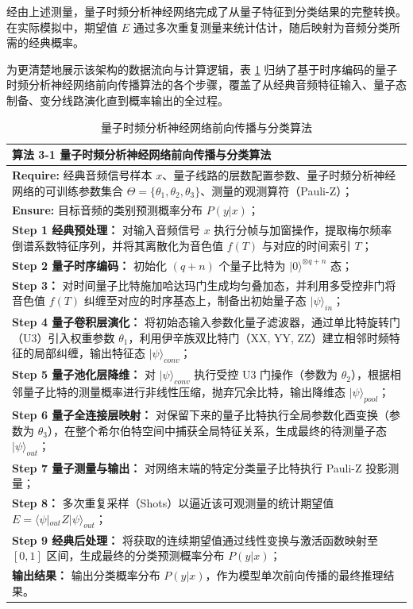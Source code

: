 经由上述测量，量子时频分析神经网络完成了从量子特征到分类结果的完整转换。在实际模拟中，期望值 $E$ 通过多次重复测量来统计估计，随后映射为音频分类所需的经典概率。

为更清楚地展示该架构的数据流向与计算逻辑，表 \ref{alg:forward_propagation} 归纳了基于时序编码的量子时频分析神经网络前向传播算法的各个步骤，覆盖了从经典音频特征输入、量子态制备、变分线路演化直到概率输出的全过程。

\begin{table}[!htb]
	\centering
	\caption{量子时频分析神经网络前向传播与分类算法}
	\label{alg:forward_propagation}
	\renewcommand{\arraystretch}{1.3} %
	\begin{tabular}{p{}}
		\toprule
		\textbf{算法 3-1} 量子时频分析神经网络前向传播与分类算法 \\
		\midrule
		\textbf{Require:} 经典音频信号样本 $x$、量子线路的层数配置参数、量子时频分析神经网络的可训练参数集合 $\Theta = \{\theta_1, \theta_2, \theta_3\}$、测量的观测算符（Pauli-Z）； \\
		\textbf{Ensure:} 目标音频的类别预测概率分布 $P(y|x)$； \\
		\textbf{Step 1 经典预处理：} 对输入音频信号 $x$ 执行分帧与加窗操作，提取梅尔频率倒谱系数特征序列，并将其离散化为音色值 $f(T)$ 与对应的时间索引 $T$； \\
		\textbf{Step 2 量子时序编码：} 初始化 $(q+n)$ 个量子比特为 $|0\rangle^{\otimes q+n}$ 态； \\
		\textbf{Step 3：} 对时间量子比特施加哈达玛门生成均匀叠加态，并利用多受控非门将音色值 $f(T)$ 纠缠至对应的时序基态上，制备出初始量子态 $|\psi\rangle_{in}$； \\
		\textbf{Step 4 量子卷积层演化：} 将初始态输入参数化量子滤波器，通过单比特旋转门（U3）引入权重参数 $\theta_1$，利用伊辛族双比特门（XX, YY, ZZ）建立相邻时频特征的局部纠缠，输出特征态 $|\psi\rangle_{conv}$； \\
		\textbf{Step 5 量子池化层降维：} 对 $|\psi\rangle_{conv}$ 执行受控 U3 门操作（参数为 $\theta_2$），根据相邻量子比特的测量概率进行非线性压缩，抛弃冗余比特，输出降维态 $|\psi\rangle_{pool}$； \\
		\textbf{Step 6 量子全连接层映射：} 对保留下来的量子比特执行全局参数化酉变换（参数为 $\theta_3$），在整个希尔伯特空间中捕获全局特征关系，生成最终的待测量子态 $|\psi\rangle_{out}$； \\
		\textbf{Step 7 量子测量与输出：} 对网络末端的特定分类量子比特执行 Pauli-Z 投影测量； \\
		\textbf{Step 8：} 多次重复采样（Shots）以逼近该可观测量的统计期望值 $E = \langle\psi|_{out} Z |\psi\rangle_{out}$； \\
		\textbf{Step 9 经典后处理：} 将获取的连续期望值通过线性变换与激活函数映射至 $[0, 1]$ 区间，生成最终的分类预测概率分布 $P(y|x)$； \\
		\textbf{输出结果：} 输出分类概率分布 $P(y|x)$，作为模型单次前向传播的最终推理结果。 \\
		\bottomrule
	\end{tabular}
\end{table}

